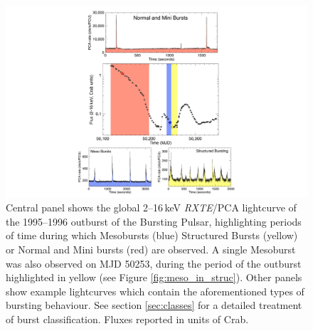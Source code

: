 \begin{figure}
  \centering
  \includegraphics[width=.9\linewidth, trim={9.5cm 0cm 10cm 0cm},clip]{images/obevo1.pdf}
  \caption[Lightcurve of the 1995--1996 outburst of the Bursting Pulsar, highlighting periods of time during which Mesobursts, Structured Bursts or Normal and Mini bursts are observed.]{\small Central panel shows the global 2--16\,keV \indexpca\textit{RXTE}/PCA lightcurve of the 1995--1996 outburst of the Bursting Pulsar, highlighting periods of time during which Mesobursts (blue) Structured Bursts (yellow) or Normal and Mini bursts (red) are observed.  A single Mesoburst was also observed on MJD 50253, during the period of the outburst highlighted in yellow (see Figure \ref{fig:meso_in_struc}).  Other panels show example lightcurves which contain the aforementioned types of bursting behaviour.  See section \ref{sec:classes} for a detailed treatment of burst classification.  Fluxes reported in units of Crab.}
  \label{fig:ob_evo1}
\end{figure}

